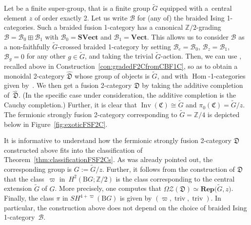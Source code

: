 \documentclass[pdftex]{sigma}
\numberwithin{equation}{section}
\begin{document}
\begin{Example}\label{ex:actionandextension}
Let  be a finite super-group, that is a finite group $\widetilde{G}$ equipped with a~central element $z$ of order exactly 2. Let us write $\mathcal{B}$ for (any of) the braided Ising 1-categories. Such a braided fusion 1-category has a canonical $\mathbb{Z}/2$-grading $\mathcal{B}=\mathcal{B}_0\boxplus \mathcal{B}_1$ with $\mathcal{B}_0=\mathbf{SVect}$ and $\mathcal{B}_1=\mathbf{Vect}$. This allows us to consider $\mathcal{B}$ as a non-faithfully $\widetilde{G}$-crossed braided 1-category by setting $\mathcal{B}_e=\mathcal{B}_0$, $\mathcal{B}_z=\mathcal{B}_1$, $\mathcal{B}_g=0$ for any other $g\in\widetilde{G}$, and taking the trivial $\widetilde{G}$-action. Then, we can use \cite[Construction~2.1.23]{DR}, recalled above in Construction~\ref{con:gradedF2CfromCBF1C}, so as to obtain a monoidal 2-category $\widehat{\mathfrak{D}}$ whose group of objects is $\widetilde{G}$, and with $\operatorname{Hom}$-1-categories given by~. We then get a fusion 2-category $\mathfrak{D}$ by taking the additive completion of~$\widehat{\mathfrak{D}}$. (In the specific case under consideration, the additive completion is the Cauchy completion.) Further, it is clear that $\operatorname{Inv}(\mathfrak{C})\cong \widetilde{G}$ and $\pi_0(\mathfrak{C})=\widetilde{G}/z$. The fermionic strongly fusion 2-category corresponding to $\widetilde{G}=\mathbb{Z}/4$ is depicted below in Figure~\ref{fig:exoticFSF2C}.

It is informative to understand how the fermionic strongly fusion 2-category $\mathfrak{D}$ constructed above fits into the classification of Theorem~\ref{thm:classificationFSF2Cs}. As was already pointed out, the corresponding group is $G:=\widetilde{G}/z$. Further, it follows from the construction of $\mathfrak{D}$ that the class~$\varpi$ in~$H^2(\mathrm{B}G;\mathbb{Z}/2)$ is the class corresponding to the central extension $\widetilde{G}$ of $G$. More precisely, one computes that $\Omega\mathscr{Z}(\mathfrak{D})\simeq\mathbf{Rep}\big(\widetilde{G},z\big)$. Finally, the class $\pi$ in $SH^{4+\varpi}(\mathrm{B}G)$ is given by $(\varpi, \operatorname{triv}, \operatorname{triv})$. In particular, the construction above does not depend on the choice of braided Ising 1-category~$\mathcal{B}$.
\end{Example}
\end{document}
